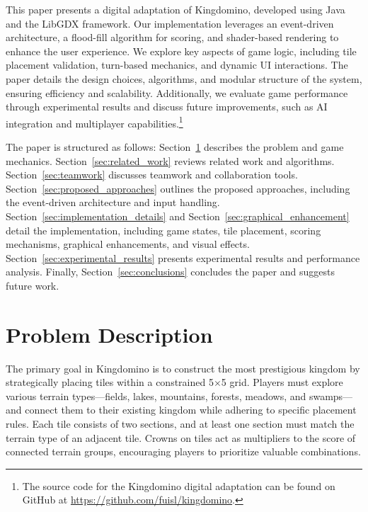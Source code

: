 \documentclass[conference]{IEEEtran}
\begin{document}
This paper presents a digital adaptation of Kingdomino, developed using Java
and the LibGDX framework. Our implementation leverages an event-driven
architecture, a flood-fill algorithm for scoring, and shader-based rendering to
enhance the user experience. We explore key aspects of game logic, including
tile placement validation, turn-based mechanics, and dynamic UI interactions.
The paper details the design choices, algorithms, and modular structure of the
system, ensuring efficiency and scalability. Additionally, we evaluate game
performance through experimental results and discuss future improvements, such
as AI integration and multiplayer capabilities.\footnote{The source code for
    the Kingdomino digital adaptation can be found on GitHub at
    \url{https://github.com/fuisl/kingdomino}.}

The paper is structured as follows: Section~\ref{sec:problem_description}
describes the problem and game mechanics. Section~\ref{sec:related_work}
reviews related work and algorithms. Section~\ref{sec:teamwork} discusses
teamwork and collaboration tools. Section~\ref{sec:proposed_approaches}
outlines the proposed approaches, including the event-driven architecture and
input handling. Section~\ref{sec:implementation_details} and
Section~\ref{sec:graphical_enhancement} detail the implementation, including
game states, tile placement, scoring mechanisms, graphical enhancements, and
visual effects. Section~\ref{sec:experimental_results} presents experimental
results and performance analysis. Finally, Section~\ref{sec:conclusions}
concludes the paper and suggests future work.

\section{Problem Description}
\label{sec:problem_description}

The primary goal in Kingdomino is to construct the most prestigious kingdom by
strategically placing tiles within a constrained 5$\times$5 grid. Players must
explore various terrain types—fields, lakes, mountains, forests, meadows, and
swamps—and connect them to their existing kingdom while adhering to specific
placement rules. Each tile consists of two sections, and at least one section
must match the terrain type of an adjacent tile. Crowns on tiles act as
multipliers to the score of connected terrain groups, encouraging players to
prioritize valuable combinations.
\end{document}
